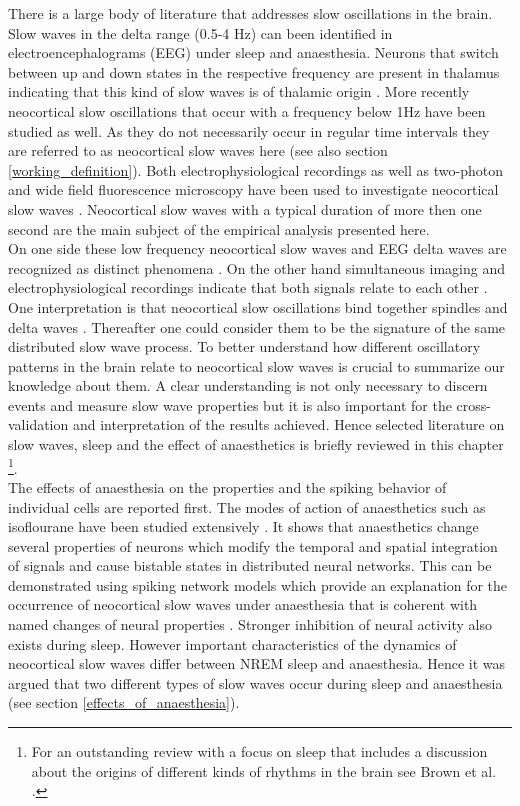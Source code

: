 There is a large body of literature that addresses slow oscillations in the brain. Slow waves in the delta range (0.5-4 Hz) can been identified in electroencephalograms (EEG) under sleep and anaesthesia. Neurons that switch between up and down states in the respective frequency are present in thalamus indicating that this kind of slow waves is of thalamic origin \parencite[1110]{brown2012control}. More recently neocortical slow oscillations that occur with a frequency below 1Hz have been studied as well. As they do not necessarily occur in regular time intervals they are referred to as neocortical slow waves here (see also section \ref{working_definition}). Both electrophysiological recordings as well as two-photon and wide field fluorescence microscopy have been used to investigate neocortical slow waves \parencite{niethard2018cortical, celotto2020analysis}. Neocortical slow waves with a typical duration of more then one second are the main subject of the empirical analysis presented here.\\
 On one side these low frequency neocortical slow waves and EEG delta waves are recognized as distinct phenomena \parencite[p. 1110]{brown2012control}. On the other hand simultaneous imaging and electrophysiological recordings indicate that both signals relate to each other \parencite{niethard2018cortical}. One interpretation is that neocortical slow oscillations bind together spindles and delta waves \parencite[p. 1110]{brown2012control}. Thereafter one could consider them to be the signature of the same distributed slow wave process. To better understand how different oscillatory patterns in the brain relate to neocortical slow waves is crucial to summarize our knowledge about them. A clear understanding is not only necessary to discern events and measure slow wave properties but it is also important for the cross-validation and interpretation of the results achieved. Hence selected literature on slow waves, sleep and the effect of anaesthetics is briefly reviewed in this chapter \footnote{For an outstanding review with a focus on sleep that includes a discussion about the origins of different kinds of rhythms in the brain see Brown et al. \parencite*{brown2012control}.}. \\
The effects of anaesthesia on the properties and the spiking behavior of individual cells are reported first. The modes of action of anaesthetics such as isoflourane have been studied extensively \parencite{qazzaz2017modulation, moghadam2019comparative, eger1981isoflurane, jenkins1999effects}. It shows that anaesthetics change several properties of neurons which modify the temporal and spatial integration of signals and cause bistable states in distributed neural networks. This can be demonstrated using spiking network models which provide an explanation for the occurrence of neocortical slow waves under anaesthesia that is coherent with named changes of neural properties \parencite{nghiem2018two}. Stronger inhibition of neural activity also exists during sleep. However important characteristics of the dynamics of neocortical slow waves differ between NREM sleep and anaesthesia. Hence it was argued that two different types of slow waves occur during sleep and anaesthesia (see section \ref{effects_of_anaesthesia}). \\
